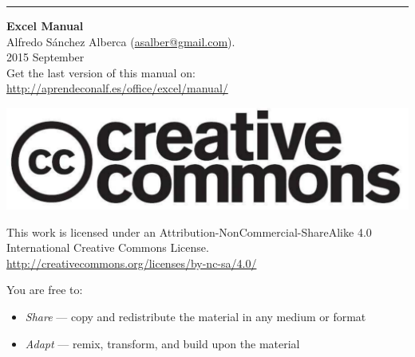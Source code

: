\thispagestyle{empty}
\null
\vfill
\hrule depth 3pt
\smallskip
\sffamily
\noindent \textbf{Excel Manual}\\
Alfredo Sánchez Alberca (\url{asalber@gmail.com}).\\
2015 September\\
Get the last version of this manual on: \url{http://aprendeconalf.es/office/excel/manual/}
\smallskip

\begin{center}
\includegraphics[scale=0.1]{../img/cc-logo.pdf}
\end{center}

\smallskip

\small
This work is licensed under an Attribution-NonCommercial-ShareAlike 4.0 International Creative Commons License. 
\url{http://creativecommons.org/licenses/by-nc-sa/4.0/}

\smallskip

You are free to:
\begin{itemize}
\item \emph{Share} — copy and redistribute the material in any medium or format
\item \emph{Adapt} — remix, transform, and build upon the material
\end{itemize}

